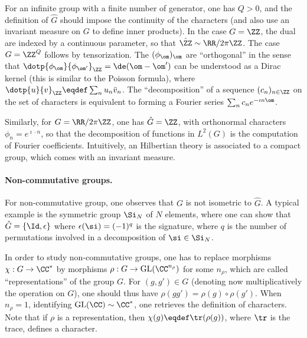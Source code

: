 For an infinite group with a finite number of generator, one has  $Q>0$, and the definition of $\hat G$ should impose the continuity of the characters (and also use an invariant measure on $G$ to define inner products). In the case $G=\ZZ$, the dual are indexed by a continuous parameter, 
so that $\hat \ZZ \sim \RR/2\pi\ZZ$.
%
The case $G=\ZZ^Q$ follows by tensorization. 
%
The $(\phi_\om)_\om$ are ``orthogonal'' in the sense that $\dotp{\phi_\om}{\phi_{\om'}}_\ZZ = \de(\om-\om')$ can be understood as a Dirac kernel (this is similar to the Poisson formula), where $\dotp{u}{v}_\ZZ \eqdef \sum_n u_n \bar v_n$. 
%
The ``decomposition'' of a sequence $(c_n)_{n \in \ZZ}$ on the set of characters is equivalent to forming a Fourier series $\sum_n c_n e^{-\imath n \om}$. 

Similarly, for $G=\RR/2\pi\ZZ$, one has $\hat G=\ZZ$, with orthonormal characters $\phi_n=e^{\imath \cdot n}$, so that the decomposition of functions in $L^2(G)$ is the computation of Fourier coefficients.
%
Intuitively, an Hilbertian theory is associated to a compact group, which comes with an invariant measure. 

\paragraph{Non-commutative groups.}
 
For non-commutative group, one observes that $G$ is not isometric to $\hat G$. A typical example is the symmetric group $\Si_N$ of $N$ elements, where one can show that $\hat G = \{\Id,\epsilon\}$ where $\epsilon(\si) = (-1)^{q}$ is the signature, where $q$ is the number of permutations involved in a decomposition of $\si \in \Si_N$. 

In order to study non-commutative groups, one has to replace morphisms $\chi : G \rightarrow \CC^*$ by morphisms $\rho : G \rightarrow \text{GL}(\CC^{n_\rho})$ for some $n_\rho$, which are called ``representations'' of the group $G$. For $(g,g') \in G$ (denoting now multiplicatively the operation on $G$), one should thus have $\rho(gg')=\rho(g) \circ \rho(g')$. When $n_\rho=1$, identifying $\text{GL}(\CC) \sim \CC^*$, one retrieves the definition of characters. Note that if $\rho$ is a representation, then $\chi(g) \eqdef \tr(\rho(g))$, where $\tr$ is the trace, defines a character. 

